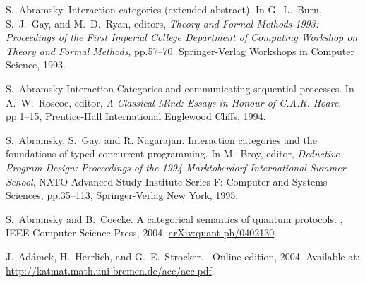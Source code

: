 \begin{thebibliography}{RSW00}

    S.\ Abramsky.
    \newblock Interaction categories (extended abstract).
    \newblock In G.\ L.\ Burn, S.\ J.\ Gay, and M.\ D.\ Ryan, editors, {\sl
      Theory and Formal Methods 1993: Proceedings of the First Imperial College
    Department of Computing Workshop on Theory and Formal Methods}, pp.57--70.
    Springer-Verlag Workshops in Computer Science, 1993.

    S.\ Abramsky
    \newblock Interaction Categories and communicating sequential processes.
    \newblock In A.\ W.\ Roscoe, editor, {\sl A Classical Mind: Essays in Honour
    of C.A.R. Hoare}, pp.1--15, Prentice-Hall International Englewood Cliffs,
    1994.


    S.\ Abramsky, S.\ Gay, and R. Nagarajan. 
    \newblock Interaction categories and the foundations of typed concurrent programming.
    \newblock In M.\ Broy, editor, {\sl Deductive Program Design: Proceedings of
    the 1994 Marktoberdorf International Summer School}, NATO Advanced Study
    Institute Series F: Computer and Systems Sciences, pp.35--113, Springer-Verlag New York, 1995.

%
    S.\ Abramsky and B.\ Coecke.
    \newblock A categorical semantics of quantum protocols.
    , IEEE Computer Science Press, 2004.
    \newblock \href{http://arxiv.org/abs/quant-ph/0402130}{arXiv:quant-ph/0402130}.

    J.\ Ad\'amek, H.\ Herrlich, and G.\ E.\ Strocker. 
    . Online
    edition, 2004.
    \newblock Available at:
    \href{http://katmat.math.uni-bremen.de/acc/acc.pdf}{http://katmat.math.uni-bremen.de/acc/acc.pdf}.




\end{thebibliography}
